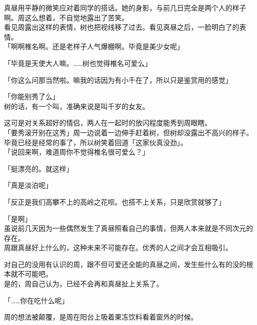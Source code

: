 真昼用平静的微笑应对着同学的搭话。她的身影，与前几日完全是两个人的样子啊。周这么想着，不自觉地露出了苦笑。\\

看见周露出这样的表情，树也把视线移了过去。看见真昼之后，一脸明白了的表情。\\

「啊啊椎名啊。还是老样子人气爆棚啊。毕竟是美少女呢」

「毕竟是天使大人嘛。……树也觉得椎名可爱么」

「你这么问那当然啦。嘛我的话因为有小千在了，所以只是鉴赏用的感觉」

「你能别秀了么」\\

树的话，有一个叫，准确来说是叫千岁的女友。

这可是对关系超好的情侣，两人在一起时的放闪程度能秀到周眼瞎。\\

「要秀滚开别在这秀」周一边说着一边伸手赶着树，但树却没露出不高兴的样子。毕竟已经是经常的事了，所以树笑着回道「这家伙真没劲」。\\

「说回来啊，难道周你不觉得椎名很可爱么？」

「挺漂亮的。就这样」

「真是淡泊呢」

「反正是我们高攀不上的高岭之花呗。也搭不上关系，只是欣赏就够了」

「是啊」\\

虽说前几天因为一些偶然发生了真昼照看自己的事情，但两人本来就是不同次元的存在。\\

周跟真昼好上什么的，这种未来不可能存在。优秀的人之间才会互相吸引。

对自己的没用有认识的周，跟不但可爱还全能的真昼之间，发生些什么有的没的根本就不可能吧。\\

是的，周自己认为，已经不会再和真昼扯上关系了。\\

\vspace{2\baselineskip}

「……你在吃什么呢」

周的想法被颠覆，是周在阳台上吸着果冻饮料看着窗外的时候。
